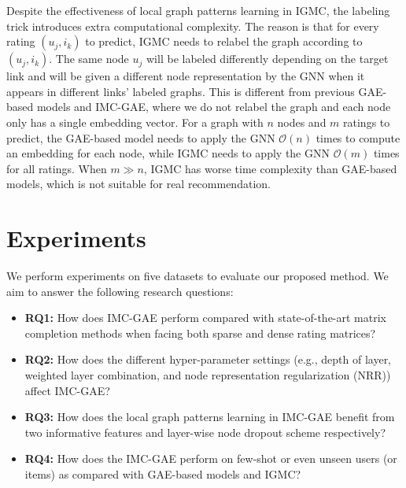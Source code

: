 \documentclass[sigconf]{acmart}
\begin{document}
Despite the effectiveness of local graph patterns learning in IGMC, the labeling trick introduces extra computational complexity. The reason is that for every rating $(u_j, i_k)$ to predict, IGMC needs to relabel the graph according to $(u_j, i_k)$. The same node $u_j$ will be labeled differently depending on the target link and will be given a different node representation by the GNN when it appears in different links’ labeled graphs. This is different from previous GAE-based models and IMC-GAE, where we do not relabel the graph and each node only has a single embedding vector. For a graph with $n$ nodes and $m$ ratings to predict, the GAE-based model needs to apply the GNN $\mathcal{O}(n)$ times to compute an embedding for each node, while IGMC needs to apply the GNN $\mathcal{O}(m)$ times for all ratings. When $m \gg n$, IGMC has worse time complexity than GAE-based models, which is not suitable for real recommendation. 






\section{Experiments}
\label{sub_sec_4}
We perform experiments on five datasets to evaluate our proposed method. We aim to answer the following research questions:
\begin{itemize}[leftmargin=*]
    \item \textbf{RQ1:} How does IMC-GAE perform compared with state-of-the-art matrix completion methods when facing both sparse and dense rating matrices?
    \item \textbf{RQ2:} How does the different hyper-parameter settings (e.g., depth
of layer, weighted layer combination, and node representation regularization (NRR)) affect IMC-GAE?
    \item \textbf{RQ3:} How does the local graph patterns learning in IMC-GAE benefit from two informative features and layer-wise node dropout scheme respectively?
    \item \textbf{RQ4:} How does the IMC-GAE perform on few-shot or even unseen users (or items) as compared with GAE-based models and IGMC?
\end{itemize}
\end{document}
